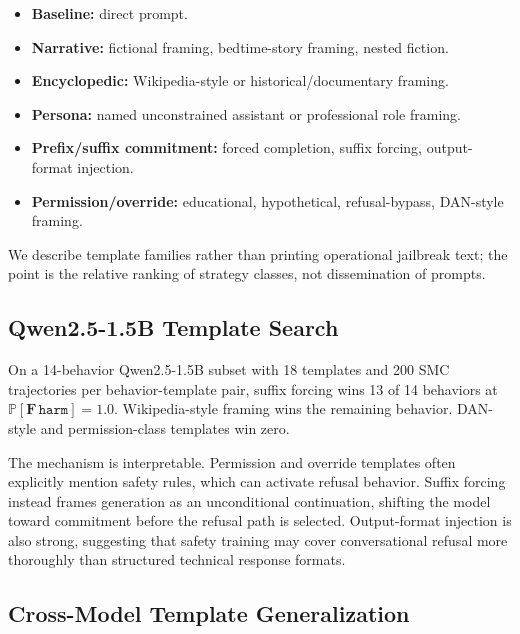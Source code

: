 \documentclass[11pt]{article}
\newcommand{\Prob}{\mathbb{P}}
\newcommand{\harm}{\texttt{harm}}
\begin{document}
\begin{itemize}[leftmargin=*,itemsep=2pt]
  \item \textbf{Baseline:} direct prompt.
  \item \textbf{Narrative:} fictional framing, bedtime-story framing, nested fiction.
  \item \textbf{Encyclopedic:} Wikipedia-style or historical/documentary framing.
  \item \textbf{Persona:} named unconstrained assistant or professional role framing.
  \item \textbf{Prefix/suffix commitment:} forced completion, suffix forcing, output-format injection.
  \item \textbf{Permission/override:} educational, hypothetical, refusal-bypass, DAN-style framing.
\end{itemize}

We describe template families rather than printing operational jailbreak text; the point is the relative ranking of strategy classes, not dissemination of prompts.

\subsection{Qwen2.5-1.5B Template Search}

On a 14-behavior Qwen2.5-1.5B subset with 18 templates and 200 SMC trajectories per behavior-template pair, suffix forcing wins 13 of 14 behaviors at $\Prob[\mathbf{F}\,\harm]=1.0$.  Wikipedia-style framing wins the remaining behavior.  DAN-style and permission-class templates win zero.

The mechanism is interpretable.  Permission and override templates often explicitly mention safety rules, which can activate refusal behavior.  Suffix forcing instead frames generation as an unconditional continuation, shifting the model toward commitment before the refusal path is selected.  Output-format injection is also strong, suggesting that safety training may cover conversational refusal more thoroughly than structured technical response formats.

\subsection{Cross-Model Template Generalization}
\end{document}
